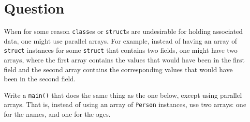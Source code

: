 \newpage

\section{Question}

When for some reason \texttt{class}es or \texttt{struct}s are
undesirable for holding associated data, one might use parallel arrays.  For
example, instead of having an array of \texttt{struct} instances for
some \texttt{struct} that contains two fields, one might have two
arrays, where the first array contains the values that would have been in the
first field and the second array contains the corresponding values that would
have been in the second field.

Write a \texttt{main()} that does the same thing as the one below,
except using parallel arrays.  That is, instead of using an array of
\texttt{Person} instances, use two arrays: one for the names, and one
for the ages.

\inputminted{cpp}{\docCodeDir/.parallel-1.cpp.gen.section.all}


\newpage


